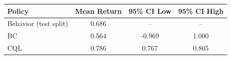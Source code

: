 \begin{tabular}{lccc}
\toprule
Policy & Mean Return & 95\% CI Low & 95\% CI High \\
\midrule
Behavior (test split) & 0.686 & -- & -- \\
BC & 0.564 & -0.969 & 1.000 \\
CQL & 0.786 & 0.767 & 0.805 \\
\bottomrule
\end{tabular}
